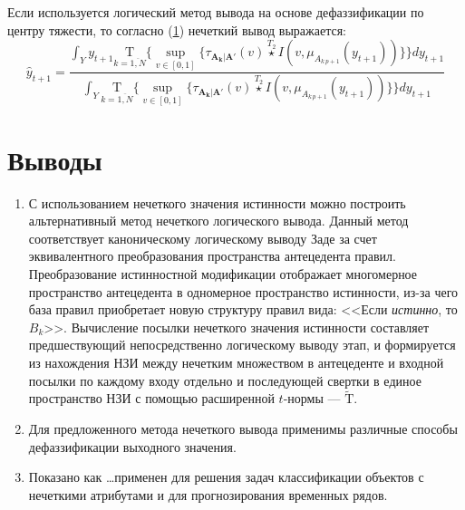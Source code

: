 Если используется логический метод вывода на основе дефаззификации по центру тяжести, то согласно (\ref{}) нечеткий вывод выражается:
\begin{equation}
\hat{y}_{t+1} = \frac{\int_Y y_{t+1} \underset{k=\overline{1,N}}{\textrm{T}}\Biggl\{\sup_{v \in [0,1]}\biggl\{\tau_{\mathbf{A_k}|\mathbf{A'}}(v)\overset{T_2}{\star} I(v, \mu_{A_{k\,p+1}}(y_{t+1}))\biggr\}\Biggr\} dy_{t+1}}{\int_Y \underset{k=\overline{1,N}}{\textrm{T}}\Biggl\{\sup_{v \in [0,1]}\biggl\{\tau_{\mathbf{A_k}|\mathbf{A'}}(v)\overset{T_2}{\star} I(v, \mu_{A_{k\,p+1}}(y_{t+1}))\biggr\}\Biggr\} dy_{t+1}}
\end{equation}



\section{Выводы}

\begin{enumerate}
	\item С использованием нечеткого значения истинности можно построить альтернативный метод нечеткого логического вывода. Данный метод соответствует каноническому логическому выводу Заде за счет эквивалентного преобразования пространства антецедента правил. Преобразование истинностной модификации отображает многомерное пространство антецедента в одномерное пространство истинности, из-за чего база правил приобретает новую структуру правил вида: <<Если \textit{истинно}, то $B_k$>>. Вычисление посылки нечеткого значения истинности составляет предшествующий непосредственно логическому выводу этап, и формируется из нахождения НЗИ между нечетким множеством в антецеденте и входной посылки по каждому входу отдельно и последующей свертки в единое пространство НЗИ с помощью расширенной $t$-нормы --- $\tilde{\mathrm{T}}$.
	\item Для предложенного метода нечеткого вывода применимы различные способы дефаззификации выходного значения. 
	\item Показано как \dots применен для решения задач классификации объектов с нечеткими атрибутами и для прогнозирования временных рядов.
\end{enumerate}

